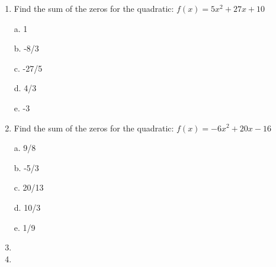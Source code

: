 \documentclass{article}
\begin{document}
    \begin{enumerate}
        

        \item Find the sum of the zeros for the quadratic: $f(x)=5 x^{2} + 27 x + 10$


\begin{minipage}[t]{.2\textwidth}
    a. 1
\end{minipage}
\begin{minipage}[t]{.2\textwidth}
    b. -8/3
\end{minipage}
\begin{minipage}[t]{.2\textwidth}
    c. -27/5
\end{minipage}
\begin{minipage}[t]{.2\textwidth}
    d. 4/3
\end{minipage}
\begin{minipage}[t]{.2\textwidth}
    e. -3
\end{minipage}



        \item Find the sum of the zeros for the quadratic: $f(x)=- 6 x^{2} + 20 x - 16$


\begin{minipage}[t]{.2\textwidth}
    a. 9/8
\end{minipage}
\begin{minipage}[t]{.2\textwidth}
    b. -5/3
\end{minipage}
\begin{minipage}[t]{.2\textwidth}
    c. 20/13
\end{minipage}
\begin{minipage}[t]{.2\textwidth}
    d. 10/3
\end{minipage}
\begin{minipage}[t]{.2\textwidth}
    e. 1/9
\end{minipage}



        \item 

        \item 
    \end{enumerate}
\end{document}
